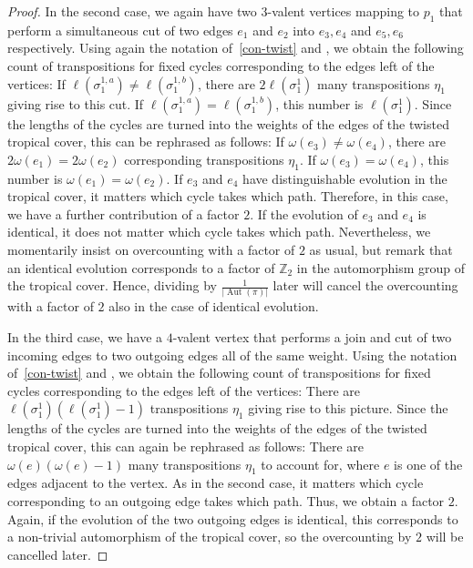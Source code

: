 \documentclass[11pt]{article}
\theoremstyle{definition}
\numberwithin{equation}{section}
\DeclareMathOperator{\Aut}{Aut}
\begin{document}
\begin{proof}
In the second case, we again have two $3$-valent vertices mapping to $p_1$ that perform a simultaneous cut of two edges $e_1$ and $e_2$ into $e_3,e_4$ and $e_5,e_6$ respectively.  Using again the notation of~\cref{con-twist} and \cite[Theorem 2.12]{BF21}, we obtain the following count of transpositions for fixed cycles corresponding to the edges left of the vertices: If $\ell(\sigma_1^{1,a})\neq\ell(\sigma_1^{1,b})$, there are $2\ell(\sigma_1^1)$ many transpositions $\eta_1$ giving rise to this cut. If $\ell(\sigma_1^{1,a})=\ell(\sigma_1^{1,b})$, this number is $\ell(\sigma_1^1)$.
    Since the lengths of the cycles are turned into the weights of the edges of the twisted tropical cover, this can be rephrased as follows:    If $\omega(e_3)\neq\omega(e_4)$, there are $2\omega(e_1)=2\omega(e_2)$ corresponding transpositions $\eta_1$. If $\omega(e_3)=\omega(e_4)$, this number is $\omega(e_1)=\omega(e_2)$. If $e_3$ and $e_4$ have distinguishable evolution in the tropical cover, it matters which cycle takes which path. Therefore, in this case, we have a further contribution of a factor $2$. If the evolution of $e_3$ and $e_4$ is identical, it does not matter which cycle takes which path. Nevertheless, we momentarily insist on overcounting with a factor of $2$ as usual, but remark that an identical evolution     corresponds to a factor of $\mathbb{Z}_2$ in the automorphism group of the tropical cover. Hence, dividing by $\frac{1}{|\Aut(\pi)|}$ later will cancel the overcounting with a factor of $2$ also in the case of identical evolution.
    
In the third case, we have a $4$-valent vertex that performs a join and cut of two incoming edges to two outgoing edges all of the same weight. Using the notation of~\cref{con-twist} and \cite[Theorem 2.12]{BF21}, we obtain the following count of transpositions for fixed cycles corresponding to the edges left of the vertices:
There are $\ell(\sigma_1^1)(\ell(\sigma_1^1)-1)$ transpositions $\eta_1$ giving rise to this picture. Since the lengths of the cycles are turned into the weights of the edges of the twisted tropical cover, this can again be rephrased as follows:
There are $\omega(e)(\omega(e)-1)$ many transpositions $\eta_1$ to account for, where $e$ is one of the edges adjacent to the vertex. As in the second case, it matters which cycle corresponding to an outgoing edge takes which path. Thus, we obtain a factor $2$. Again, if the evolution of the two outgoing edges is identical, this corresponds to a non-trivial automorphism of the tropical cover, so the overcounting by $2$ will be cancelled later.


\end{proof}
\end{document}
